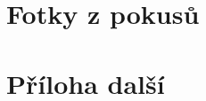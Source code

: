 \documentclass[12pt]{report}			%
\begin{document}
		\lipsum[1]
	
	\nocite{*}
    \printbibliography					%
    \printglossary[title={Zkratky}]		%
    \listoffigures						%
    \listoftables						%

    \begin{appendices}
	\chapter{Fotky z pokusů}	
	\lipsum[1]
	\chapter{Příloha další }
	\end{appendices}
\end{document}
